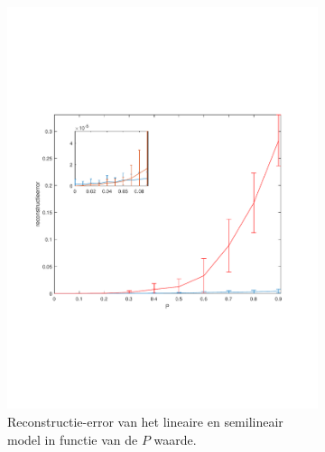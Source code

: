 \documentclass[12pt]{report}
\begin{document}
\begin{figure}
\begin{subfigure}[b]{0.5\textwidth}
\includegraphics[width=\textwidth,trim=0 200 0 175 cm]{PMC_10_100_El.pdf}
\caption{Reconstructie-error van het lineaire en semilineair model in functie van de $P$ waarde. \label{fig:El}}
\end{subfigure}
\begin{subfigure}[b]{0.5\textwidth}

\end{subfigure}
\end{figure}
\end{document}
